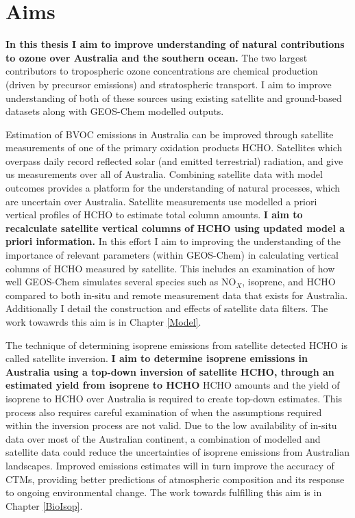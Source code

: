 \section{Aims}
\label{LR:Aims}

  \textbf{In this thesis I aim to improve understanding of natural contributions to ozone over Australia and the southern ocean.}
  The two largest contributors to tropospheric ozone concentrations are chemical production (driven by precursor emissions) and stratospheric transport.
  I aim to improve understanding of both of these sources using existing satellite and ground-based datasets along with GEOS-Chem modelled outputs.
  
  Estimation of BVOC emissions in Australia can be improved through satellite measurements of one of the primary oxidation products HCHO.
  Satellites which overpass daily record reflected solar (and emitted terrestrial) radiation, and give us measurements over all of Australia.
  Combining satellite data with model outcomes provides a platform for the understanding of natural processes, which are uncertain over Australia.
  Satellite measurements use modelled a priori vertical profiles of HCHO to estimate total column amounts.
  \textbf{I aim to recalculate satellite vertical columns of HCHO using updated model a priori information.}
  In this effort I aim to improving the understanding of the importance of relevant parameters (within GEOS-Chem) in calculating vertical columns of HCHO measured by satellite.
  This includes an examination of how well GEOS-Chem simulates several species such as NO$_X$, isoprene, and HCHO compared to both in-situ and remote measurement data that exists for Australia.
  Additionally I detail the construction and effects of satellite data filters.
  The work towawrds this aim is in Chapter \ref{Model}.
  
  The technique of determining isoprene emissions from satellite detected HCHO is called satellite inversion.
  \textbf{I aim to determine isoprene emissions in Australia using a top-down inversion of satellite HCHO, through an estimated yield from isoprene to HCHO}
  HCHO amounts and the yield of isoprene to HCHO over Australia is required to create top-down estimates.
  This process also requires careful examination of when the assumptions required within the inversion process are not valid.
  Due to the low availability of in-situ data over most of the Australian continent, a combination of modelled and satellite data could reduce the uncertainties of isoprene emissions from Australian landscapes.
  Improved emissions estimates will in turn improve the accuracy of CTMs, providing better predictions of atmospheric composition and its response to ongoing environmental change.
  The work towards fulfilling this aim is in Chapter \ref{BioIsop}.
  
